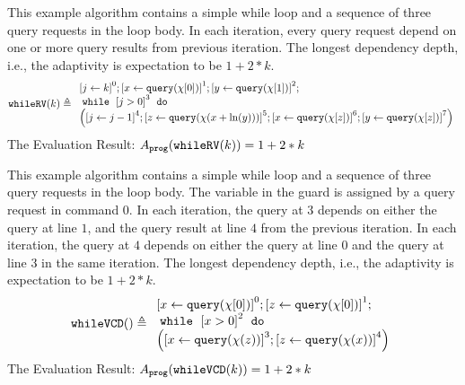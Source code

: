             \begin{example}
   \label{ex:whileRV}
   This example algorithm contains a simple while loop
    and a sequence of three query requests in the loop body.
In each iteration, every query request depend on one or more
query results from previous iteration.
The longest dependency depth, i.e., the adaptivity is expectation to be $1 +2 * k$.
   \[
   \kw{whileRV}(k) \triangleq 
   \begin{array}{l}
   \clabel{\assign{j}{k} }^{0} ; 
   \clabel{ \assign{x}{\query(\chi[0])}}^{1} ; 
\clabel{ \assign{y}{\query(\chi[1])}}^{2} ; \\
    \ewhile ~ \clabel{j > 0}^{3} ~ \edo ~ \\
    \Big(
     \clabel{\assign{j}{j-1}}^{4} ;
     \clabel{\assign{z}{\query(\chi(x + \ln(y)))} }^{5}  ; 
     \clabel{ \assign{x}{\query(\chi[z])}}^{6} ; 
     \clabel{ \assign{y}{\query(\chi[z])}}^{7} 
    \Big)
\end{array}
   \]
   The Evaluation Result: $ A_{\mathtt{prog}}(\mathtt{whileRV}(k)) = 1 + 2 * k $
            \end{example}
   \begin{example}
\label{ex:whileVCD}
%
This example algorithm contains a simple while loop
and a sequence of three query requests in the loop body.
The variable in the guard is assigned by a query request in command $0$.
In each iteration, the query at $3$ depends on either the query at line $1$, and the query result at line $4$ from the previous iteration.
In each iteration, the query at $4$ depends on either the query at line $0$ and the query at line $3$ in the same iteration.
The longest dependency depth, i.e., the adaptivity is expectation to be $1 +2 * k$.
\[
\kw{whileVCD}() \triangleq
\begin{array}{l}
    \clabel{ \assign{x}{\query(\chi[0])} }^{0} ; 
    \clabel{ \assign{z}{\query(\chi[0])} }^{1} ; \\
        \ewhile ~ \clabel{x > 0}^{2} ~ \edo ~ \\
        \Big(
        \clabel{\assign{x}{\query(\chi(z))} }^{3}  ; 
        \clabel{\assign{z}{\query(\chi(x))}}^{4}
      \Big)
    \end{array}
\]
The Evaluation Result: $ A_{\mathtt{prog}}(\mathtt{whileVCD}(k)) = 1 + 2 * k $
   \end{example}
